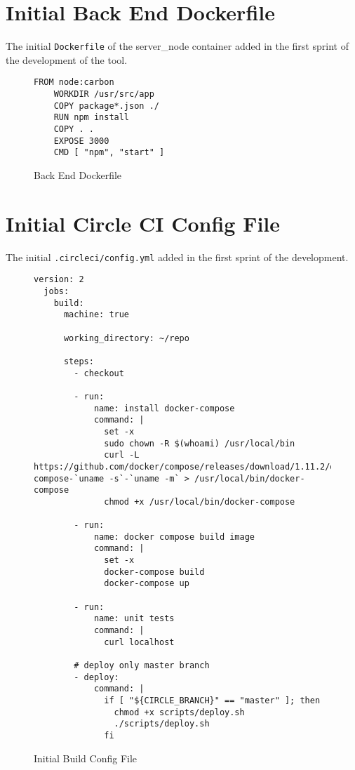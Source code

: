\newpage
\section{Initial Back End Dockerfile}
The initial \texttt{Dockerfile} of the server\_node container added in the first sprint of
the development of the tool.

\begin{figure}[h!]
    \begin{lstlisting}[basicstyle=\small]
    FROM node:carbon
    WORKDIR /usr/src/app
    COPY package*.json ./
    RUN npm install
    COPY . .
    EXPOSE 3000
    CMD [ "npm", "start" ]
  \end{lstlisting}
  \caption{Back End Dockerfile}
  \label{sample:serverdocker}
\end{figure}

\newpage
\section{Initial Circle CI Config File}
The initial \texttt{.circleci/config.yml} added in the first sprint of the development.

\begin{figure}[h!]
  \begin{lstlisting}[basicstyle=\small, breaklines=true]
  version: 2
  jobs:
    build:
      machine: true

      working_directory: ~/repo

      steps:
        - checkout

        - run:
            name: install docker-compose
            command: |
              set -x
              sudo chown -R $(whoami) /usr/local/bin
              curl -L https://github.com/docker/compose/releases/download/1.11.2/docker-compose-`uname -s`-`uname -m` > /usr/local/bin/docker-compose
              chmod +x /usr/local/bin/docker-compose

        - run:
            name: docker compose build image
            command: |
              set -x
              docker-compose build
              docker-compose up

        - run:
            name: unit tests
            command: |
              curl localhost

        # deploy only master branch
        - deploy:
            command: |
              if [ "${CIRCLE_BRANCH}" == "master" ]; then
                chmod +x scripts/deploy.sh
                ./scripts/deploy.sh
              fi
  \end{lstlisting}
  \caption{Initial Build Config File}
  \label{sample:circleci}
\end{figure}

